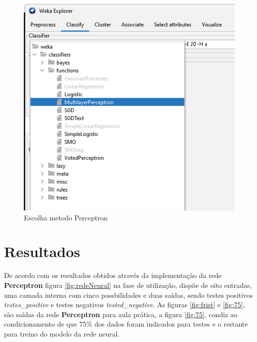 \begin{figure}[h]
  \center
  \includegraphics[scale=0.6]{figure/escolha_oerceptron.png}
  \caption{Escolha metodo Perceptron}\label{fig:escolha}
\end{figure}

\section{Resultados}

\par De acordo com os resultados obtidos através da implementação da rede \textbf{Perceptron} figura \ref{fig:redeNeural} na fase de utilização, dispõe de oito entradas, uma camada interna com cinco possbilidades e duas saídas, sendo testes positivos \textit{testes\_positive} e testes negativos \textit{tested\_negative}. As figuras \ref{fig:frist} e \ref{fig:75}, são saídas da rede \textbf{Perceptron} para aula prática, a figura \ref{fig:75}, condiz ao condicionamento de que 75\% dos dados foram indicados para testes e o restante para treino do modelo da rede neural.

